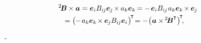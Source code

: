 \nopagebreak\vspace{-0.3em}
\begin{multline}\label{commutativity.thecrossproductofbivalentandvector}
\somebivalenttensor \hspace{-0.1ex} \times \bm{a}
= \bm{e}_i \somebivalenttensorcomponents{i\hspace{-0.1ex}j} \bm{e}_{\hspace{-0.1ex}j} \hspace{-0.25ex} \times \hspace{-0.1ex} a_k \bm{e}_k \hspace{-0.2ex}
= - \hspace{.25ex} \bm{e}_i \somebivalenttensorcomponents{i\hspace{-0.1ex}j} \hspace{.2ex} a_k \bm{e}_k \hspace{-0.25ex} \times \hspace{-0.1ex} \bm{e}_{\hspace{-0.1ex}j}
\\[-0.1em]
= \bigl( \hspace{-0.1ex} - \hspace{.25ex} a_k \bm{e}_k \hspace{-0.25ex} \times \hspace{-0.1ex} \bm{e}_{\hspace{-0.1ex}j} \somebivalenttensorcomponents{i\hspace{-0.1ex}j} \bm{e}_i \hspace{.16ex} \bigr)^{\hspace{-0.25ex}\T} \hspace{-0.4ex}
= - \hspace{.1ex} \bigl( \hspace{.12ex} \bm{a} \times \hspace{-0.2ex} \somebivalenttensortransposed \hspace{.1ex} \bigr)^{\hspace{-0.25ex}\T}
\hspace{-0.4ex} ,
\hspace{1em}
\end{multline}

\noindent
{}
~\en{,}
\crossproductinquotes\hbox{-}


